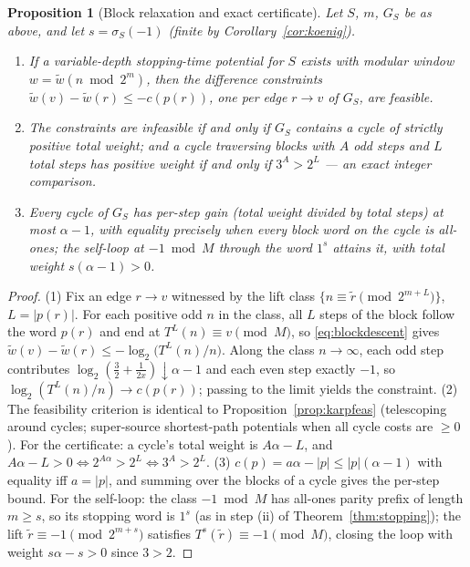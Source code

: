 \documentclass[11pt]{amsart}
\newtheorem{proposition}[theorem]{Proposition}
\theoremstyle{definition}
\theoremstyle{remark}
\begin{document}
\begin{proposition}[Block relaxation and exact certificate]\label{prop:blockkarp}
Let $S$, $m$, $G_S$ be as above, and let $s = \sigma_S(-1)$ (finite by Corollary~\ref{cor:koenig}).
\begin{enumerate}
\item If a variable-depth stopping-time potential for $S$ exists with modular window $w = \tilde w(n \bmod 2^m)$, then the difference constraints $\tilde w(v) - \tilde w(r) \le -c(p(r))$, one per edge $r \to v$ of $G_S$, are feasible.
\item The constraints are infeasible if and only if $G_S$ contains a cycle of strictly positive total weight; and a cycle traversing blocks with $A$ odd steps and $L$ total steps has positive weight if and only if $3^A > 2^L$ --- an exact integer comparison.
\item Every cycle of $G_S$ has per-step gain (total weight divided by total steps) at most $\alpha - 1$, with equality precisely when every block word on the cycle is all-ones; the self-loop at $-1 \bmod M$ through the word $1^s$ attains it, with total weight $s(\alpha - 1) > 0$.
\end{enumerate}
\end{proposition}

\begin{proof}
(1) Fix an edge $r \to v$ witnessed by the lift class $\{n \equiv \tilde r \pmod{2^{m+L}}\}$, $L = |p(r)|$. For each positive odd $n$ in the class, all $L$ steps of the block follow the word $p(r)$ and end at $T^L(n) \equiv v \pmod M$, so \eqref{eq:blockdescent} gives $\tilde w(v) - \tilde w(r) \le -\log_2 \bigl(T^L(n)/n\bigr)$. Along the class $n \to \infty$, each odd step contributes $\log_2(\tfrac32 + \tfrac1{2x}) \downarrow \alpha - 1$ and each even step exactly $-1$, so $\log_2(T^L(n)/n) \to c(p(r))$; passing to the limit yields the constraint. (2) The feasibility criterion is identical to Proposition~\ref{prop:karpfeas} (telescoping around cycles; super-source shortest-path potentials when all cycle costs are $\ge 0$). For the certificate: a cycle's total weight is $A\alpha - L$, and $A\alpha - L > 0 \iff 2^{A\alpha} > 2^L \iff 3^A > 2^L$. (3) $c(p) = a\alpha - |p| \le |p|(\alpha - 1)$ with equality iff $a = |p|$, and summing over the blocks of a cycle gives the per-step bound. For the self-loop: the class $-1 \bmod M$ has all-ones parity prefix of length $m \ge s$, so its stopping word is $1^s$ (as in step (ii) of Theorem~\ref{thm:stopping}); the lift $\tilde r \equiv -1 \pmod{2^{m+s}}$ satisfies $T^s(\tilde r) \equiv -1 \pmod{M}$, closing the loop with weight $s\alpha - s > 0$ since $3 > 2$.
\end{proof}
\end{document}
